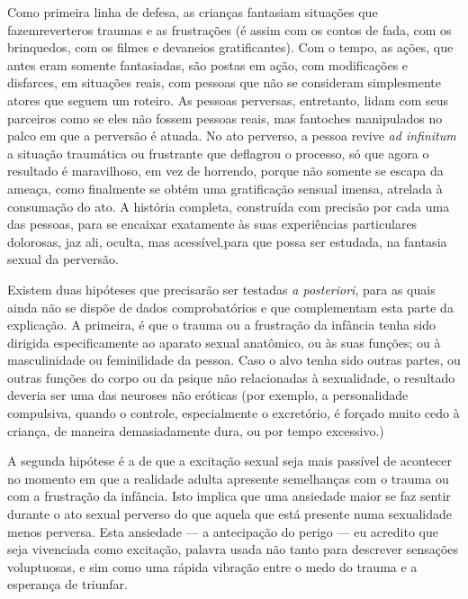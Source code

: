 Como primeira linha de defesa, as crianças fantasiam situações que
fazem\idxtraumareve[|(] reverter\idxfantareve[|(] os traumas e as frustrações (é assim com os contos de
fada, com os brinquedos, com os filmes e devaneios gratificantes). Com
o tempo, as ações, que antes eram somente fantasiadas, são postas em
ação, com modificações e disfarces, em situações reais, com pessoas que
não se consideram simplesmente atores que seguem um roteiro. As pessoas
perversas, entretanto, lidam com seus parceiros como se eles não fossem
pessoas reais,\idxdesu{} mas fantoches manipulados no palco em que a perversão é
atuada. No ato perverso,\idxtraumaobje{} a pessoa revive \textit{ad infinitum} a
situação traumática ou frustrante que deflagrou o processo, só que
agora o resultado é maravilhoso, em vez de horrendo, porque não
somente se escapa da ameaça, como finalmente se obtém uma gratificação
sensual imensa, atrelada à consumação do ato. A história completa,
construída com precisão por cada uma das pessoas, para se encaixar
exatamente às suas experiências particulares dolorosas, jaz ali,
oculta, mas acessível,\idxtraumareve[|)] para que possa ser estudada, na fantasia sexual
da perversão.

Existem duas hipóteses que precisarão ser testadas
\textit{a posteriori}, para as quais ainda não se dispõe de dados
comprobatórios e que complementam esta parte da explicação. A
primeira, é que o trauma ou a frustração da infância tenha sido
dirigida especificamente ao aparato sexual anatômico, ou às suas
funções; ou à masculinidade ou feminilidade da pessoa. Caso o alvo
tenha sido outras partes, ou outras funções do corpo ou da psique não
relacionadas à sexualidade, o resultado deveria ser uma das neuroses
não eróticas (por exemplo, a personalidade compulsiva, quando o
controle, especialmente o excretório, é forçado muito cedo à criança,
de maneira demasiadamente dura, ou por tempo excessivo.)

A segunda hipótese é a de que a excitação sexual seja mais passível
de acontecer no momento em que a realidade adulta apresente semelhanças
com o trauma ou com a frustração\idxsexueang{} da infância.\idxangu{} Isto implica que uma
ansiedade maior se faz sentir durante o ato sexual perverso do que
aquela que está presente numa sexualidade menos perversa. Esta
ansiedade --- a antecipação do perigo --- eu acredito que seja
vivenciada como excitação, palavra usada não tanto para descrever
sensações voluptuosas, e sim como uma rápida vibração entre o medo do
trauma e a esperança de triunfar.

